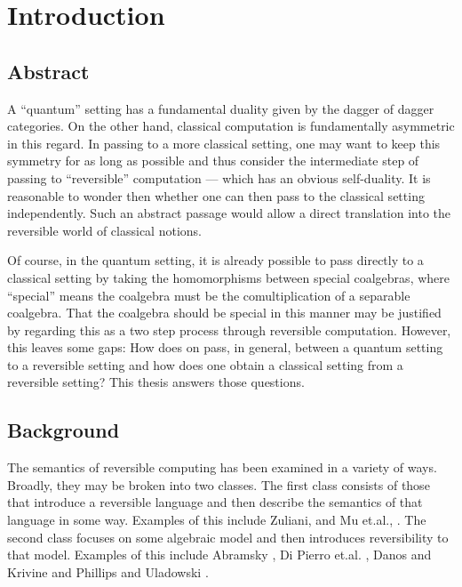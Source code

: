 \chapter{Introduction}\label{chap:introduction}
\section{Abstract}\label{sec:abstract}
A ``quantum'' setting has a fundamental duality given by the dagger of dagger
categories\cite{selinger05:dagger,abramsky05:abstractscalars}. On the other hand, classical
computation is fundamentally asymmetric in this regard. In passing to a more classical setting, one
may want to keep this symmetry for as long as possible and thus consider the intermediate step of
passing to ``reversible'' computation --- which has an obvious self-duality. It is reasonable to
wonder then whether one can then pass to the classical setting independently. Such an abstract
passage would allow a direct translation into the reversible world of classical notions.

Of course, in the quantum setting, it is already possible to pass directly to a classical setting by
taking the homomorphisms between special coalgebras, where ``special'' means the coalgebra must be
the comultiplication of a separable coalgebra. That the coalgebra should be special in this manner
may be justified by regarding this as a two step process through reversible computation. However,
this leaves some gaps: How does on pass, in general, between a quantum setting to a reversible
setting and how does one obtain a classical setting from a reversible setting? This thesis answers
those questions.
\section{Background}
\label{sec:background}

The semantics of reversible computing has been examined in a variety of ways. Broadly, they may be
broken into two classes. The first class consists of those that introduce a reversible
language and then describe the semantics of that language in some way. Examples of this include
Zuliani, \cite{zuliani01:reversibility} and Mu et.al., \cite{muetal04:injreversible}. The second
class focuses on some algebraic model and then introduces reversibility to that model. Examples of this
include Abramsky \cite{abramsky05:reversible}, Di Pierro et.al. \cite{DiPierro200625}, Danos and
Krivine \cite{danos2004reversible} and Phillips and Uladowski \cite{phillips2006operational}.

